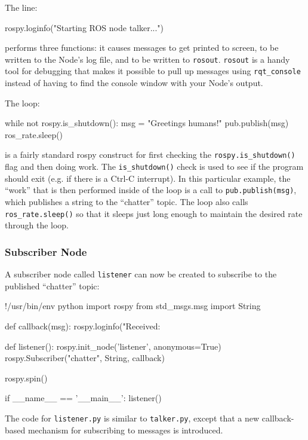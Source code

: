 \vspace{\baselineskip}
\noindent
The line:
\begin{pythonnoborder}
rospy.loginfo("Starting ROS node talker...")
\end{pythonnoborder}
performs three functions: it causes messages to get printed to screen, to be written to the Node's log file, and to be written to \texttt{rosout}. \texttt{rosout} is a handy tool for debugging that makes it possible to pull up messages using \texttt{rqt\_console} instead of having to find the console window with your Node's output.

\vspace{\baselineskip}
\noindent
The loop:
\begin{pythonnoborder}
while not rospy.is_shutdown():
    msg = "Greetings humans!"
    pub.publish(msg)
    ros_rate.sleep()
\end{pythonnoborder}
is a fairly standard rospy construct for first checking the \texttt{rospy.is\_shutdown()} flag and then doing work. The \texttt{is\_shutdown()} check is used to see if the program should exit (e.g. if there is a Ctrl-C interrupt). In this particular example, the ``work'' that is then performed inside of the loop is a call to \texttt{pub.publish(msg)}, which publishes a string to the ``chatter'' topic. The loop also calls \texttt{ros\_rate.sleep()} so that it sleeps just long enough to maintain the desired rate through the loop.

\subsubsection{Subscriber Node}
A subscriber node called \texttt{listener} can now be created to subscribe to the published ``chatter'' topic:
\begin{python}
!/usr/bin/env python
import rospy
from std_msgs.msg import String

def callback(msg):
    rospy.loginfo("Received: %
    
def listener():
    rospy.init_node('listener', anonymous=True)
    rospy.Subscriber("chatter", String, callback)

    rospy.spin()

if __name__ == '__main__':
    listener()
\end{python}

The code for \texttt{listener.py} is similar to \texttt{talker.py}, except that a new callback-based mechanism for subscribing to messages is introduced.

